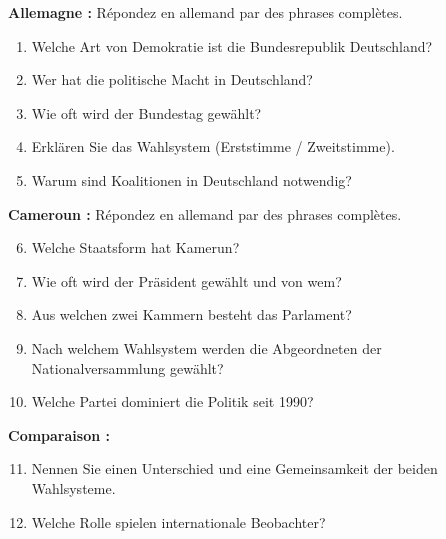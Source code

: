 \documentclass[11pt]{article}
\begin{document}
\begin{exercice}
\textbf{Allemagne :} Répondez en allemand par des phrases complètes.
\begin{enumerate}
    \item Welche Art von Demokratie ist die Bundesrepublik Deutschland?
    \item Wer hat die politische Macht in Deutschland?
    \item Wie oft wird der Bundestag gewählt?
    \item Erklären Sie das Wahlsystem (Erststimme / Zweitstimme).
    \item Warum sind Koalitionen in Deutschland notwendig?
\end{enumerate}
\textbf{Cameroun :} Répondez en allemand par des phrases complètes.
\begin{enumerate}
    \setcounter{enumi}{5}
    \item Welche Staatsform hat Kamerun?
    \item Wie oft wird der Präsident gewählt und von wem?
    \item Aus welchen zwei Kammern besteht das Parlament?
    \item Nach welchem Wahlsystem werden die Abgeordneten der Nationalversammlung gewählt?
    \item Welche Partei dominiert die Politik seit 1990?
\end{enumerate}
\textbf{Comparaison :}
\begin{enumerate}
    \setcounter{enumi}{10}
    \item Nennen Sie einen Unterschied und eine Gemeinsamkeit der beiden Wahlsysteme.
    \item Welche Rolle spielen internationale Beobachter?
\end{enumerate}
\end{exercice}
\end{document}

